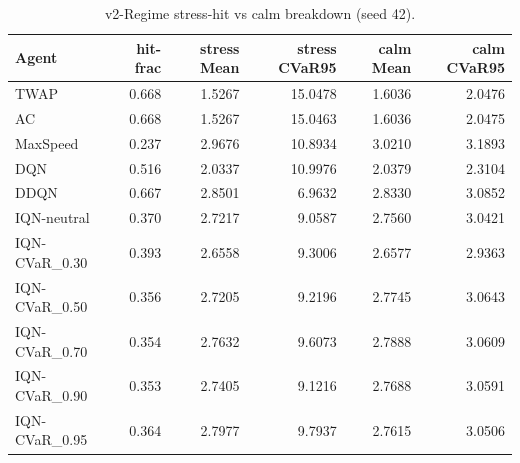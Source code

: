 \begin{table}[H]
    \centering
    \caption{v2-Regime stress-hit vs calm breakdown (seed 42).}
    \label{tab:v2_regime_breakdown}
    \begin{tabular}{@{}lrrrrr@{}}
        \toprule
        Agent & hit-frac & stress Mean & stress CVaR95 & calm Mean & calm CVaR95 \\
        \midrule
        TWAP & 0.668 & 1.5267 & 15.0478 & 1.6036 & 2.0476 \\
        AC & 0.668 & 1.5267 & 15.0463 & 1.6036 & 2.0475 \\
        MaxSpeed & 0.237 & 2.9676 & 10.8934 & 3.0210 & 3.1893 \\
        DQN & 0.516 & 2.0337 & 10.9976 & 2.0379 & 2.3104 \\
        DDQN & 0.667 & 2.8501 & 6.9632 & 2.8330 & 3.0852 \\
        IQN-neutral & 0.370 & 2.7217 & 9.0587 & 2.7560 & 3.0421 \\
        IQN-CVaR\_0.30 & 0.393 & 2.6558 & 9.3006 & 2.6577 & 2.9363 \\
        IQN-CVaR\_0.50 & 0.356 & 2.7205 & 9.2196 & 2.7745 & 3.0643 \\
        IQN-CVaR\_0.70 & 0.354 & 2.7632 & 9.6073 & 2.7888 & 3.0609 \\
        IQN-CVaR\_0.90 & 0.353 & 2.7405 & 9.1216 & 2.7688 & 3.0591 \\
        IQN-CVaR\_0.95 & 0.364 & 2.7977 & 9.7937 & 2.7615 & 3.0506 \\
        \bottomrule
    \end{tabular}
\end{table}
